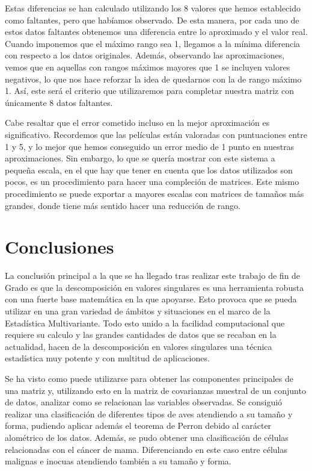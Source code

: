 \documentclass[tfg,cienciasbased,lot,lof,covers,final,overleaf,nocopyright]{tfgtfmthesisuam}
\begin{document}
Estas diferencias se han calculado utilizando los 8 valores que hemos establecido como faltantes, pero que habíamos observado. De esta manera, por cada uno de estos datos faltantes obtenemos una diferencia entre lo aproximado y el valor real. Cuando imponemos que el máximo rango sea 1, llegamos a la mínima diferencia con respecto a los datos originales. Además, observando las aproximaciones, vemos que en aquellas con rangos máximos mayores que 1 se incluyen valores negativos, lo que nos hace reforzar la idea de quedarnos con la de rango máximo 1. Así, este será el criterio que utilizaremos para completar nuestra matriz con únicamente 8 datos faltantes.

Cabe resaltar que el error cometido incluso en la mejor aproximación es significativo. Recordemos que las películas están valoradas con puntuaciones entre 1 y 5, y lo mejor que hemos conseguido un error medio de 1 punto en nuestras aproximaciones. Sin embargo, lo que se quería mostrar con este sistema a pequeña escala, en el que hay que tener en cuenta que los datos utilizados son pocos, es un procedimiento para hacer una compleción de matrices. Este mismo procedimiento se puede exportar a mayores escalas con matrices de tamaños más grandes, donde tiene más sentido hacer una reducción de rango.

\chapter{Conclusiones}

La conclusión principal a la que se ha llegado tras realizar este trabajo de fin de Grado es que la descomposición en valores singulares es una herramienta robusta con una fuerte base matemática en la que apoyarse. Esto provoca que se pueda utilizar en una gran variedad de ámbitos y situaciones en el marco de la Estadística Multivariante. Todo esto unido a la facilidad computacional que requiere su calculo y las grandes cantidades de datos que se recaban en la actualidad, hacen de la descomposición en valores singulares una técnica estadística muy potente y con multitud de aplicaciones.

Se ha visto como puede utilizarse para obtener las componentes principales de una matriz y, utilizando esto en la matriz de covarianzas muestral de un conjunto de datos, analizar como se relacionan las variables observadas. Se consiguió realizar una clasificación de diferentes tipos de aves atendiendo a su tamaño y forma, pudiendo aplicar además el teorema de Perron debido al carácter alométrico de los datos. Además, se pudo obtener una clasificación de células relacionadas con el cáncer de mama. Diferenciando en este caso entre células malignas e inocuas atendiendo también a su tamaño y forma.
\end{document}
